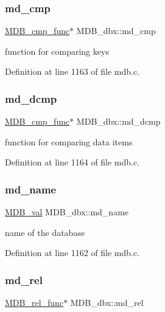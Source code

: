 \subsubsection{\texorpdfstring{md\+\_\+cmp}{md\_cmp}}
{\footnotesize\ttfamily \mbox{\hyperlink{group__mdb_gac1ea382293d1da331ab88ca59052847d}{M\+D\+B\+\_\+cmp\+\_\+func}}$\ast$ M\+D\+B\+\_\+dbx\+::md\+\_\+cmp}

function for comparing keys 

Definition at line 1163 of file mdb.\+c.

\mbox{\label{struct_m_d_b__dbx_a79e8f44261045d7390fe69620e31e917}} 
\subsubsection{\texorpdfstring{md\+\_\+dcmp}{md\_dcmp}}
{\footnotesize\ttfamily \mbox{\hyperlink{group__mdb_gac1ea382293d1da331ab88ca59052847d}{M\+D\+B\+\_\+cmp\+\_\+func}}$\ast$ M\+D\+B\+\_\+dbx\+::md\+\_\+dcmp}

function for comparing data items 

Definition at line 1164 of file mdb.\+c.

\mbox{\label{struct_m_d_b__dbx_afcb04fa7b107cf82bd68a4ad8e8ff17b}} 
\subsubsection{\texorpdfstring{md\+\_\+name}{md\_name}}
{\footnotesize\ttfamily \mbox{\hyperlink{struct_m_d_b__val}{M\+D\+B\+\_\+val}} M\+D\+B\+\_\+dbx\+::md\+\_\+name}

name of the database 

Definition at line 1162 of file mdb.\+c.

\mbox{\label{struct_m_d_b__dbx_a5a507a8a31ca1cec34393e4966765572}} 
\subsubsection{\texorpdfstring{md\+\_\+rel}{md\_rel}}
{\footnotesize\ttfamily \mbox{\hyperlink{group__mdb_ga311e8b7d73c5e7c03b625a894c5014cb}{M\+D\+B\+\_\+rel\+\_\+func}}$\ast$ M\+D\+B\+\_\+dbx\+::md\+\_\+rel}

